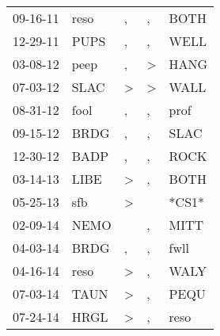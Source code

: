 \begin{supertabular}{p{0.07\textwidth}p{0.06\textwidth}p{0.02\textwidth}p{0.02\textwidth}p{0.06\textwidth}}
          09-16-11\textsuperscript{} &           reso\textsuperscript{} &                , &                , &           BOTH\textsuperscript{} \\
          12-29-11\textsuperscript{} &           PUPS\textsuperscript{} &                , &                , &           WELL\textsuperscript{} \\
          03-08-12\textsuperscript{} &           peep\textsuperscript{} &                , &     \textgreater &           HANG\textsuperscript{} \\
          07-03-12\textsuperscript{} &           SLAC\textsuperscript{} &     \textgreater &     \textgreater &           WALL\textsuperscript{} \\
          08-31-12\textsuperscript{} &           fool\textsuperscript{} &                , &                , &           prof\textsuperscript{} \\
          09-15-12\textsuperscript{} &           BRDG\textsuperscript{} &                , &                , &           SLAC\textsuperscript{} \\
          12-30-12\textsuperscript{} &           BADP\textsuperscript{} &                , &                , &           ROCK\textsuperscript{} \\
          03-14-13\textsuperscript{} &           LIBE\textsuperscript{} &     \textgreater &                , &           BOTH\textsuperscript{} \\
          05-25-13\textsuperscript{} &            sfb\textsuperscript{} &     \textgreater &                  &                            *CS1* \\
          02-09-14\textsuperscript{} &           NEMO\textsuperscript{} &                  &                , &           MITT\textsuperscript{} \\
          04-03-14\textsuperscript{} &           BRDG\textsuperscript{} &                , &                , &           fwll\textsuperscript{} \\
          04-16-14\textsuperscript{} &           reso\textsuperscript{} &     \textgreater &                , &           WALY\textsuperscript{} \\
          07-03-14\textsuperscript{} &           TAUN\textsuperscript{} &     \textgreater &                , &           PEQU\textsuperscript{} \\
          07-24-14\textsuperscript{} &           HRGL\textsuperscript{} &     \textgreater &                , &           reso\textsuperscript{} \\

\end{supertabular}
